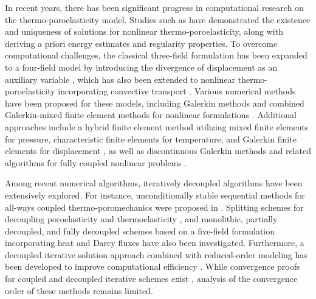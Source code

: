 \documentclass{article}
\numberwithin{equation}{section}
\begin{document}
In recent years, there has been significant progress in computational research on the thermo-poroelasticity model. Studies such as \cite{brun2019well} have demonstrated the existence and uniqueness of solutions for nonlinear thermo-poroelasticity, along with deriving a priori energy estimates and regularity properties. To overcome computational challenges, the classical three-field formulation has been expanded to a four-field model by introducing the divergence of displacement as an auxiliary variable \cite{chen2022multiphysics}, which has also been extended to nonlinear thermo-poroelasticity incorporating convective transport \cite{Ge2023analysis}. Various numerical methods have been proposed for these models, including Galerkin methods and combined Galerkin-mixed finite element methods for nonlinear formulations \cite{zhang2024coupling, zhang2022galerkin}. Additional approaches include a hybrid finite element method utilizing mixed finite elements for pressure, characteristic finite elements for temperature, and Galerkin finite elements for displacement \cite{Zhang2023mfe}, as well as discontinuous Galerkin methods and related algorithms for fully coupled nonlinear problems \cite{bonetti2024robust, antonietti2023discontinuous}.

Among recent numerical algorithms, iteratively decoupled algorithms have been extensively explored. For instance, unconditionally stable sequential methods for all-ways coupled thermo-poromechanics were proposed in \cite{Kim2018unconditionally}. Splitting schemes for decoupling poroelasticity and thermoelasticity \cite{Kolesov2014splitting}, and monolithic, partially decoupled, and fully decoupled schemes based on a five-field formulation incorporating heat and Darcy fluxes \cite{brun2020monolithic} have also been investigated. Furthermore, a decoupled iterative solution approach combined with reduced-order modeling has been developed to improve computational efficiency \cite{Ballarin2024projection}. While convergence proofs for coupled and decoupled iterative schemes exist \cite{Kolesov2014splitting, brun2020monolithic}, analysis of the convergence order of these methods remains limited.
\end{document}
